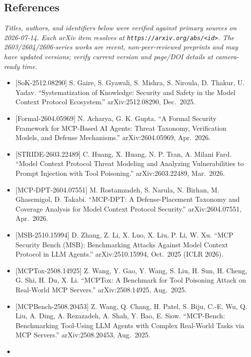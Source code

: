 \documentclass[
]{article}
\providecommand{\tightlist}{%
  \setlength{\itemsep}{0pt}\setlength{\parskip}{0pt}}
\begin{document}
\subsection{References}\label{references}

\emph{Titles, authors, and identifiers below were verified against
primary sources on 2026-07-14. Each arXiv item resolves at
\texttt{https://arxiv.org/abs/\textless{}id\textgreater{}}. The
2603/2604/2606-series works are recent, non-peer-reviewed preprints and
may have updated versions; verify current version and page/DOI details
at camera-ready time.}

\begin{itemize}
\tightlist
\item
  {[}SoK-2512.08290{]} S. Gaire, S. Gyawali, S. Mishra, S. Niroula, D.
  Thakur, U. Yadav. ``Systematization of Knowledge: Security and Safety
  in the Model Context Protocol Ecosystem.'' arXiv:2512.08290,
  Dec.~2025.
\item
  {[}Formal-2604.05969{]} N. Acharya, G. K. Gupta. ``A Formal Security
  Framework for MCP-Based AI Agents: Threat Taxonomy, Verification
  Models, and Defense Mechanisms.'' arXiv:2604.05969, Apr.~2026.
\item
  {[}STRIDE-2603.22489{]} C. Huang, X. Huang, N. P. Tran, A. Milani
  Fard. ``Model Context Protocol Threat Modeling and Analyzing
  Vulnerabilities to Prompt Injection with Tool Poisoning.''
  arXiv:2603.22489, Mar.~2026.
\item
  {[}MCP-DPT-2604.07551{]} M. Rostamzadeh, S. Narula, N. Birhan, M.
  Ghasemigol, D. Takabi. ``MCP-DPT: A Defense-Placement Taxonomy and
  Coverage Analysis for Model Context Protocol Security.''
  arXiv:2604.07551, Apr.~2026.
\item
  {[}MSB-2510.15994{]} D. Zhang, Z. Li, X. Luo, X. Liu, P. Li, W. Xu.
  ``MCP Security Bench (MSB): Benchmarking Attacks Against Model Context
  Protocol in LLM Agents.'' arXiv:2510.15994, Oct.~2025 (ICLR 2026).
\item
  {[}MCPTox-2508.14925{]} Z. Wang, Y. Gao, Y. Wang, S. Liu, H. Sun, H.
  Cheng, G. Shi, H. Du, X. Li. ``MCPTox: A Benchmark for Tool Poisoning
  Attack on Real-World MCP Servers.'' arXiv:2508.14925, Aug.~2025.
\item
  {[}MCPBench-2508.20453{]} Z. Wang, Q. Chang, H. Patel, S. Biju, C.-E.
  Wu, Q. Liu, A. Ding, A. Rezazadeh, A. Shah, Y. Bao, E. Siow.
  ``MCP-Bench: Benchmarking Tool-Using LLM Agents with Complex
  Real-World Tasks via MCP Servers.'' arXiv:2508.20453, Aug.~2025.
\item

\end{itemize}
\end{document}
